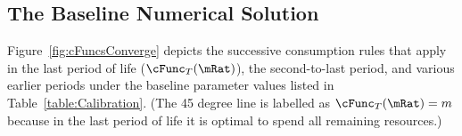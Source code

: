 \documentclass[BufferStockTheory]{subfiles}
\begin{document}
\begin{comment}
  A useful alternative version is
  \begin{verbatimwrite}{\EqDir/FVACAlt}
    \begin{align}
      \DiscFac \Rfree \PGro^{-\CRRA} \uInvEpShkuInv^{1-\CRRA}   & < \Rfree/\PGro \nonumber
      \\ \PatPGro \uInvEpShkuInv^{1/\CRRA-1}  & < (\Rfree/\PGro)^{1/\CRRA} \label{eq:FVACAlt}.
    \end{align}
  \end{verbatimwrite}
  
\end{comment}

\begin{comment}
  In the case where the permanent shocks are lognormally distributed, we have
  \begin{align}
    \Ex[\pshk^{1-\CRRA}] & = &\exp((1-\CRRA)(-\sigma^{2}_{\pshk}/2)+(1-\CRRA)^{2}\sigma_{\pshk}^{2})
    \\  & = \exp((1-\CRRA)((-1/2)+(1-\CRRA))\sigma_{\pshk}^{2})
    \\  & = \exp((1-\CRRA)(1/2-\CRRA)\sigma_{\pshk}^{2})
  \end{align}
\end{comment}

\begin{comment}
  Equation
  \eqref{eq:GIC} can be raised to the $\CRRA$ power yielding the
  alternative form $(\Rfree \DiscFac) \PGroAdj^{-\CRRA} < 1$ which
  Deaton~\citeyearpar{deatonLiqConstr} imposed to guarantee that his
  problem defined a contraction mapping.
\end{comment}


\hypertarget{Baseline-Numerical-Solution}{}
\subsection{The Baseline Numerical Solution}

Figure~\ref{fig:cFuncsConverge} depicts the successive consumption
rules that apply in the last period of life ($\cFunc_{T}(\mRat)$), the
second-to-last period, and various earlier periods under the
baseline parameter values listed in Table~\ref{table:Calibration}.
(The 45 degree line is labelled as $\cFunc_{T}(\mRat) = m$ because in
the last period of life it is optimal to spend all remaining
resources.)

\hypertarget{Calibration}{}


\end{document}
